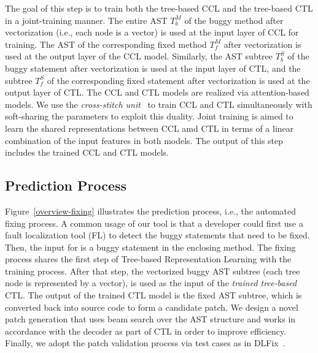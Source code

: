 \vspace{3pt}
  The goal of this step is to train both the tree-based CCL
and the tree-based CTL in a joint-training manner. The entire AST
$T^{M}_b$ of the buggy method after vectorization (i.e., each node is
a vector) is used at the input layer of CCL for training. The AST of
the corresponding fixed method $T^{M}_f$ after vectorization is used
at the output layer of the CCL model. Similarly, the AST subtree
$T^{S}_b$ of the buggy statement after vectorization is used at the
input layer of CTL, and the subtree $T^{S}_f$ of the corresponding
fixed statement after vectorization is used at the output layer of
CTL. The CCL and CTL models are realized via attention-based
 models.
We use the {\em cross-stitch unit}~\cite{misra2016cross} to train CCL
and CTL simultaneously with soft-sharing the parameters to exploit
this duality. Joint training is aimed to learn the shared
representations between CCL amd CTL in terms of a linear combination
of the input features in both models. The output of this step includes
the trained CCL and CTL models.

\subsection{Prediction Process}



Figure~\ref{overview-fixing} illustrates the prediction process, i.e.,
the automated fixing process. A common usage of our tool is that
a developer could first use a fault localization tool
(FL) to detect the buggy statements that need to be fixed. Then, the
input for {\tool} is a buggy statement in the enclosing method.
The fixing process shares the first step of Tree-based Representation
Learning with the training process. After that step, the vectorized
buggy AST subtree (each tree node is represented by a vector), is used
as the input of the {\em trained tree-based} CTL. The output of the
trained CTL model is the fixed AST subtree, which is converted back
into source code to form a candidate patch. We design a novel patch
generation that uses beam search over the AST structure and works in
accordance with the decoder as part of CTL in order to improve
efficiency. Finally, we adopt the patch validation process via test
cases as in DLFix~\cite{icse20}.

